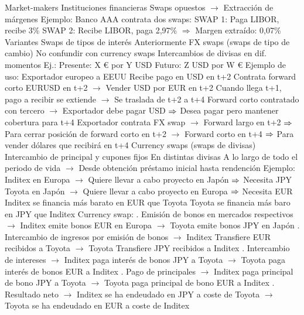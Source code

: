 \documentclass{nuevotema}
\begin{document}
\begin{esquemal}
			\3 Market-makers
				\4 Instituciones financieras
				\4 Swaps opuestos
				\4[] $\to$ Extracción de márgenes
				\4 Ejemplo:
				\4[] Banco AAA contrata dos swaps:
				\4[] SWAP 1: Paga LIBOR, recibe 3\%
				\4[] SWAP 2: Recibe LIBOR, paga 2,97\%
				\4[] $\Rightarrow$ Margen extraído: 0,07\%
		\2 Variantes
			\3 Swaps de tipos de interés
				\4 Anteriormente
			\3 FX swaps (swaps de tipo de cambio)
				\4 No confundir con currency swaps
				\4 Intercambios de divisas en dif. momentos
				\4 Ej.:
				\4[] Presente: X € por Y USD
				\4[] Futuro: Z USD por W €
				\4 Ejemplo de uso:
				\4[] Exportador europeo a EEUU
				\4[] Recibe pago en USD en t+2
				\4[] Contrata forward corto EURUSD en t+2
				\4[] $\to$ Vender USD por EUR en t+2
				\4[] Cuando llega t+1, pago a recibir se extiende
				\4[] $\to$ Se traslada de t+2 a t+4
				\4[] Forward corto contratado con tercero
				\4[] $\to$ Exportador debe pagar USD
				\4[] $\Rightarrow$ Desea pagar pero mantener cobertura para t+4
				\4[] Exportador contrata FX swap
				\4[] $\to$ Forward largo en t+2
				\4[] $\Rightarrow$ Para cerrar posición de forward corto en t+2
				\4[] $\to$ Forward corto en t+4
				\4[] $\Rightarrow$ Para vender dólares que recibirá en t+4
			\3 Currency swaps (swaps de divisas)
				\4 Intercambio de principal y cupones fijos
				\4[] En distintas divisas
				\4[] A lo largo de todo el periodo de vida
				\4[] $\to$ Desde obtención préstamo inicial hasta rendención
				\4 Ejemplo:
				\4[] Inditex en Europa
				\4[] $\to$ Quiere llevar a cabo proyecto en Japón
				\4[] $\Rightarrow$ Necesita JPY
				\4[] Toyota en Japón
				\4[] $\to$ Quiere llevar a cabo proyecto en Europa
				\4[] $\Rightarrow$ Necesita EUR
				\4[] Inditex se financia más barato en EUR que Toyota
				\4[] Toyota se financia más baro en JPY que Inditex
				\4[] Currency swap:
				. Emisión de bonos en mercados respectivos
				\4[] $\to$ Inditex emite bonos EUR en Europa
				\4[] $\to$ Toyota emite bonos JPY en Japón
				. Intercambio de ingresos por emisión de bonos
				\4[] $\to$ Inditex Transfiere EUR recibidos a Toyota
				\4[] $\to$ Toyota Transfiere JPY recibidos a Inditex
				. Intercambio de intereses
				\4[] $\to$ Inditex paga interés de bonos JPY a Toyota
				\4[] $\to$ Toyota paga interés de bonos EUR a Inditex
				. Pago de principales
				\4[] $\to$ Inditex paga principal de bono JPY a Toyota
				\4[] $\to$ Toyota paga principal de bono EUR a Inditex
				. Resultado neto
				\4[] $\to$ Inditex se ha endeudado en JPY a coste de Toyota
				\4[] $\to$ Toyota se ha endeudado en EUR a coste de Inditex

\end{esquemal}
\end{document}

